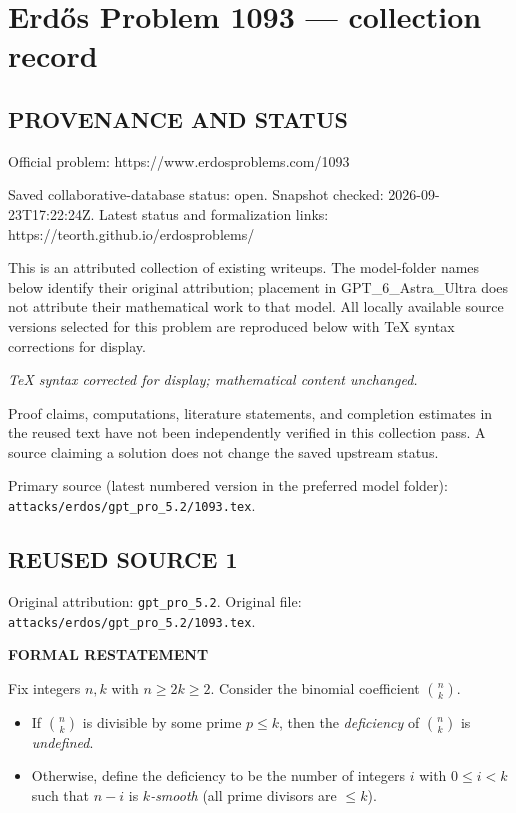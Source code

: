 \section*{Erd\H{o}s Problem 1093 --- collection record}

\subsection*{PROVENANCE AND STATUS}
Official problem: https://www.erdosproblems.com/1093

Saved collaborative-database status: open.
Snapshot checked: 2026-09-23T17:22:24Z.
Latest status and formalization links: https://teorth.github.io/erdosproblems/

This is an attributed collection of existing writeups. The model-folder names below identify their original attribution; placement in GPT\_6\_Astra\_Ultra does not attribute their mathematical work to that model. All locally available source versions selected for this problem are reproduced below with TeX syntax corrections for display.

\emph{TeX syntax corrected for display; mathematical content unchanged.}

Proof claims, computations, literature statements, and completion estimates in the reused text have not been independently verified in this collection pass. A source claiming a solution does not change the saved upstream status.

Primary source (latest numbered version in the preferred model folder): \texttt{attacks/erdos/gpt\_pro\_5.2/1093.tex}.

\subsection*{REUSED SOURCE 1}
Original attribution: \texttt{gpt\_pro\_5.2}.
Original file: \texttt{attacks/erdos/gpt\_pro\_5.2/1093.tex}.


\textbf{FORMAL RESTATEMENT}

Fix integers $n,k$ with $n\ge 2k\ge 2$.
Consider the binomial coefficient $\binom{n}{k}$.

\begin{itemize}
\item If $\binom{n}{k}$ is divisible by some prime $p\le k$, then the \emph{deficiency} of $\binom{n}{k}$ is \emph{undefined}.
\item Otherwise, define the deficiency to be the number of integers $i$ with $0\le i<k$ such that $n-i$ is \emph{$k$-smooth} (all prime divisors are $\le k$).
\end{itemize}

